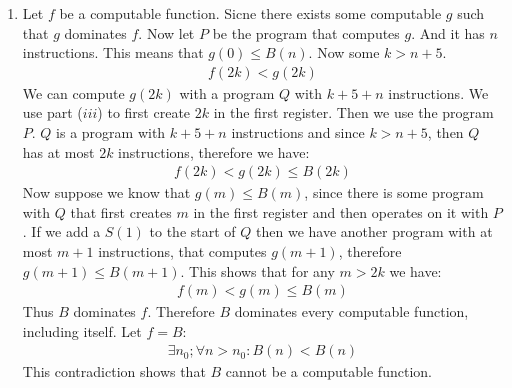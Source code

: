 \begin{enumerate}[label=\ilabel]
    \item
        Let $f$ be a computable function. Sicne there exists some computable $g$ such that $g$ dominates $f$. Now let $P$ be the program that computes $g$. And it has $n$ instructions. This means that $g(0) \le B(n)$. Now some $k > n + 5$.
        \begin{gather*}
            f(2k) < g(2k) 
        \end{gather*}
        We can compute $g(2k)$ with a program $Q$ with $k + 5 + n$ instructions. We use part ($iii$) to first create $2k$ in the first register. Then we use the program $P$. $Q$ is a program with $k + 5 + n$ instructions and since $k > n + 5$, then $Q$ has at most $2k$ instructions, therefore we have:
        \begin{gather*}
            f(2k) < g(2k) \le B(2k)
        \end{gather*}
        Now suppose we know that $g(m) \le B(m)$, since there is some program with $Q$ that first creates $m$ in the first register and then operates on it with $P$. If we add a $S(1)$ to the start of $Q$ then we have another program with at most $m + 1$ instructions, that computes $g(m + 1)$, therefore $g(m + 1) \le B(m + 1)$. This shows that for any $m > 2k$ we have:
        \begin{gather*}
            f(m) < g(m) \le B(m)
        \end{gather*}
        Thus $B$ dominates $f$. Therefore $B$ dominates every computable function, including itself. Let $f = B$:
        \begin{gather*}
            \exists n_0; \forall n > n_0: B(n) < B(n)
        \end{gather*}
        This contradiction shows that $B$ cannot be a computable function.
\end{enumerate}